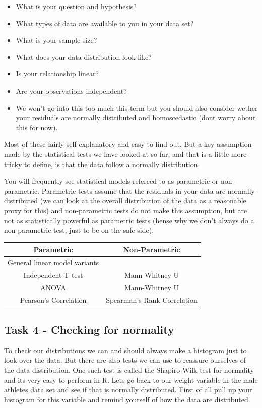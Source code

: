 \documentclass[
]{book}
\providecommand{\tightlist}{%
  \setlength{\itemsep}{0pt}\setlength{\parskip}{0pt}}
\begin{document}
\begin{itemize}
\tightlist
\item
  What is your question and hypothesis?
\item
  What types of data are available to you in your data set?
\item
  What is your sample size?
\item
  What does your data distribution look like?
\item
  Is your relationship linear?
\item
  Are your observations independent?
\item
  We won't go into this too much this term but you should also consider wether your residuals are normally distributed and homoscedastic (dont worry about this for now).
\end{itemize}

Most of these fairly self explanatory and easy to find out. But a key assumption made by the statistical tests we have looked at so far, and that is a little more tricky to define, is that the data follow a normally distribution.

You will frequently see statistical models refereed to as parametric or non-parametric. Parametric tests assume that the residuals in your data are normally distributed (we can look at the overall distribution of the data as a reasonable proxy for this) and non-parametric tests do not make this assumption, but are not as statistically powerful as parametric tests (hense why we don't always do a non-parametric test, just to be on the safe side).

\begin{longtable}[]{@{}cc@{}}
\toprule()
Parametric & Non-Parametric \\
\midrule()
\endhead
General linear model variants & \\
Independent T-test & Mann-Whitney U \\
ANOVA & Mann-Whitney U \\
Pearson's Correlation & Spearman's Rank Correlation \\
\bottomrule()
\end{longtable}

\hypertarget{task-4---checking-for-normality}{%
\subsection{Task 4 - Checking for normality}\label{task-4---checking-for-normality}}

To check our distributions we can and should always make a histogram just to look over the data. But there are also tests we can use to reassure ourselves of the data distribution. One such test is called the Shapiro-Wilk test for normality and its very easy to perform in R. Lets go back to our weight variable in the male athletes data set and see if that is normally distributed. First of all pull up your histogram for this variable and remind yourself of how the data are distributed.
\end{document}
